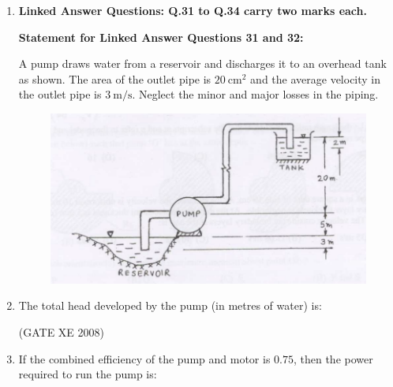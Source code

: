 \documentclass[12pt]{article}
\begin{document}
\begin{enumerate}
(GATE XE 2008)

\item[] \textbf{\Large Linked Answer Questions: Q.31 to Q.34 carry two marks each.}

\textbf{Statement for Linked Answer Questions 31 and 32:}  

A pump draws water from a reservoir and discharges it to an overhead tank as shown.  
The area of the outlet pipe is $20 \ \text{cm}^2$ and the average velocity in the outlet pipe is $3 \ \text{m/s}$.  
Neglect the minor and major losses in the piping.  

\begin{figure}[H]
\centering
  \includegraphics[width=0.8\columnwidth]{figs/ass1_d_q31.png}
  \caption{}
\end{figure}

\item The total head developed by the pump (in metres of water) is:  

\begin{enumerate}
\end{enumerate}

(GATE XE 2008)


\item If the combined efficiency of the pump and motor is $0.75$, then the power required to run the pump is:  

\begin{enumerate}
\end{enumerate}


\end{enumerate}
\end{document}
